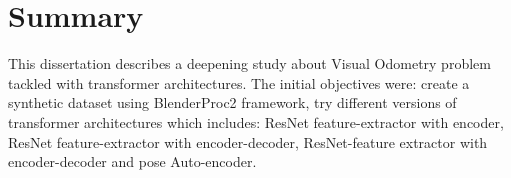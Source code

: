
\cleardoublepage
{}
{}
\begingroup
\let\clearpage\relax
\let\cleardoublepage\relax
\let\cleardoublepage\relax

\chapter*{Summary}

%
%
This dissertation describes a deepening study about Visual Odometry problem tackled with transformer architectures.
The initial objectives were: create a synthetic dataset using BlenderProc2 framework, try different versions of transformer architectures which includes:
ResNet feature-extractor with encoder, ResNet feature-extractor with encoder-decoder, ResNet-feature extractor with encoder-decoder and pose Auto-encoder.


\endgroup			

\vfill

